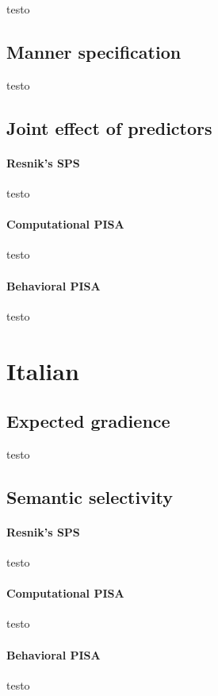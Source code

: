 testo

\subsection{Manner specification} 

testo

\subsection{Joint effect of predictors} 



\paragraph{Resnik's SPS} testo

\paragraph{Computational PISA} testo

\paragraph{Behavioral PISA} testo


\section{Italian} 


\subsection{Expected gradience} 

testo

\subsection{Semantic selectivity} 

\paragraph{Resnik's SPS} testo

\paragraph{Computational PISA} testo

\paragraph{Behavioral PISA} testo

